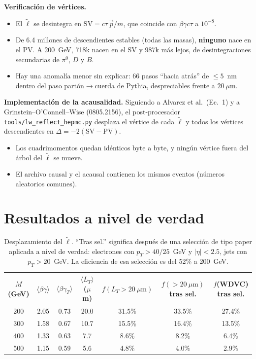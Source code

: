 \documentclass[11pt,a4paper]{article}
\newcommand{\lt}{\tilde{\ell}}
\begin{document}
\textbf{Verificación de vértices.}
\begin{itemize}
\item El $\lt$ se desintegra en $\mathrm{SV}=c\tau\,\vec p/m$, que coincide con $\beta\gamma c\tau$ a $10^{-8}$.
\item De 6.4 millones de descendientes estables (todas las masas), \textbf{ninguno} nace en el PV. A 200~GeV, 718k nacen en el SV y 987k más lejos, de desintegraciones secundarias de $\pi^0$, $D$ y $B$.
\item Hay una anomalía menor sin explicar: 66 pasos ``hacia atrás'' de $\le5$~nm dentro del paso partón$\to$cuerda de Pythia, despreciables frente a $20~\mu$m.
\end{itemize}

\textbf{Implementación de la acausalidad.} Siguiendo a Alvarez et al.\ (Ec.~1) y a Grinstein--O'Connell--Wise (0805.2156), el post-procesador \texttt{tools/lw\_reflect\_hepmc.py} desplaza el vértice de cada $\lt$ y todos los vértices descendientes en $\Delta=-2(\mathrm{SV}-\mathrm{PV})$.
\begin{itemize}
\item Los cuadrimomentos quedan idénticos byte a byte, y ningún vértice fuera del árbol del $\lt$ se mueve.
\item El archivo causal y el acausal contienen los mismos eventos (números aleatorios comunes).
\end{itemize}

\section{Resultados a nivel de verdad}
\begin{table}[H]
\centering\small
\begin{tabular}{c|cccc|cc}
\toprule
$M$ (GeV) & $\langle\beta\gamma\rangle$ & $\langle\beta\gamma_T\rangle$ & $\langle L_T\rangle$ ($\mu$m) & $f(L_T>20~\mu\mathrm{m})$ & $f(>20~\mu\mathrm{m})$ tras sel. & $f$(WDVC) tras sel.\\
\midrule
200 & 2.05 & 0.73 & 20.0 & 31.5\% & 33.5\% & 27.4\%\\
300 & 1.58 & 0.67 & 10.7 & 15.5\% & 16.4\% & 13.5\%\\
400 & 1.33 & 0.63 & 7.7 & 8.6\% & 8.2\% & 6.4\%\\
500 & 1.15 & 0.59 & 5.6 & 4.8\% & 4.0\% & 2.9\%\\
\bottomrule
\end{tabular}
\caption{Desplazamiento del $\lt$. ``Tras sel.'' significa después de una selección de tipo paper aplicada a nivel de verdad: electrones con $p_T>40/25$~GeV y $|\eta|<2.5$, jets con $p_T>20$~GeV. La eficiencia de esa selección es del 52\% a 200~GeV.}
\end{table}
\end{document}
